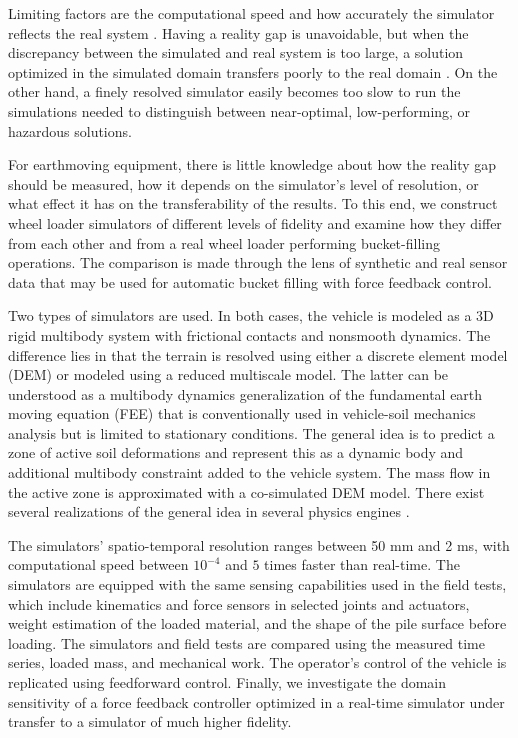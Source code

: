 \documentclass[10pt]{article}
\begin{document}
														 
Limiting factors are the computational speed and how 
accurately the simulator reflects the real system \cite{choi2021use}. 
Having a reality gap is unavoidable, but when the discrepancy between the simulated and real system is too large, 
a solution optimized in the simulated domain transfers poorly to the real domain \cite{koos2010,wiberg2023}. On the
other hand, a finely resolved simulator easily becomes too slow to run the simulations needed
to distinguish between near-optimal, low-performing, or hazardous solutions. 

For earthmoving equipment, there is little knowledge about how the reality gap should be measured, how it depends on
the simulator's level of resolution, or what effect it has on the transferability of the results. To this end,
we construct wheel loader simulators of different levels of fidelity and examine how they differ from each other
and from a real wheel loader performing bucket-filling operations. The comparison is made through the lens of 
synthetic and real sensor data that may be used for automatic bucket filling with force feedback control.

Two types of simulators are used. In both cases, the vehicle is modeled as a 3D rigid multibody system
with frictional contacts and nonsmooth dynamics. The difference lies in that the terrain is resolved using either a discrete
element model (DEM) or modeled using a reduced multiscale model. 
The latter can be understood as a multibody dynamics generalization of the fundamental earth moving equation (FEE) that is conventionally used in vehicle-soil mechanics analysis but is limited to stationary conditions. The general idea is to predict a zone of active soil deformations and represent this as a dynamic body and additional multibody constraint added to the vehicle system. The mass flow in the active zone is approximated with a co-simulated DEM model. There exist several realizations of the general idea in several physics engines \cite{Holz2009,Jaiswal2019,Servin2021}.
																	
The simulators' spatio-temporal
resolution ranges between 50 mm and 2 ms, with computational speed 
between $10^{-4}$ and $5$ times faster than real-time.  The simulators are equipped with the
same sensing capabilities used in the field tests, which include kinematics and force
sensors in selected joints and actuators, weight estimation of the loaded material, and the shape of the pile surface before
loading. The simulators and field tests are compared using the measured time series,
loaded mass, and mechanical work. The operator’s control of the vehicle is replicated using feedforward control. 
Finally, we investigate the domain sensitivity of a force feedback controller optimized
in a real-time simulator under transfer to a simulator of much higher fidelity.
\end{document}
